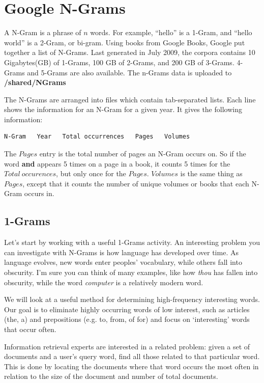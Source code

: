 \documentclass[letterpaper,10pt,openany,oneside]{sphinxmanual}
\begin{document}
\section{Google N-Grams}
\label{WmrActivities/WmrActivities:google-n-grams}
A N-Gram is a phrase of $n$ words. For example, ``hello'' is
a 1-Gram, and ``hello world'' is a 2-Gram, or bi-gram. Using books
from Google Books, Google put together a list of N-Grams. Last
generated in July 2009, the corpora contains 10 Gigabytes(GB) of
1-Grams, 100 GB of 2-Grams, and 200 GB of 3-Grams. 4-Grams and
5-Grams are also available. The n-Grams data is uploaded to \textbf{/shared/NGrams}

The N-Grams are arranged into files
which contain tab-separated lists. Each line shows the information
for an N-Gram for a given year. It gives the following information:

\begin{Verbatim}[commandchars=\\\{\}]
N-Gram   Year   Total occurrences   Pages   Volumes
\end{Verbatim}

The $Pages$ entry is the total number of pages an N-Gram
occurs on. So if the word \textbf{and} appears 5 times on a page in a
book, it counts 5 times for the $Total \ occurences$, but
only once for the $Pages$. $Volumes$ is the same
thing as $Pages$, except that it counts the number of
unique volumes or books that each N-Gram occurs in.


\subsection{1-Grams}
\label{WmrActivities/WmrActivities:grams}
Let's start by working with a useful 1-Grams activity. An
interesting problem you can investigate with N-Grams is how
language has developed over time. As language evolves, new words
enter peoples' vocabulary, while others fall into obscurity. I'm
sure you can think of many examples, like how \emph{thou} has fallen
into obscurity, while the word \emph{computer} is a relatively modern
word.

We will look at a useful method for determining high-frequency
interesting words. Our goal is to eliminate highly occurring words
of low interest, such as articles (the, a) and prepositions (e.g.
to, from, of for) and focus on `interesting' words that occur
often.

Information retrieval experts are interested in a related problem:
given a set of documents and a user's query word, find all those
related to that particular word. This is done by locating the
documents where that word occurs the most often in relation to the
size of the document and number of total documents.
\end{document}
